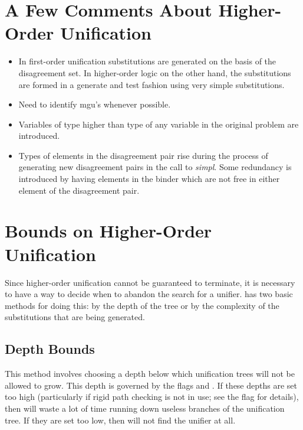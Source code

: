 \section{A Few Comments About Higher-Order Unification}
\begin{itemize}
\item In first-order unification substitutions are generated on the basis of the
disagreement set. In higher-order logic on the other hand,
the substitutions are formed in a generate and test fashion using very simple
substitutions.

\item Need to identify mgu's whenever possible.

\item Variables of type higher than type of any variable in the original problem are
introduced.

\item Types of elements in the disagreement pair rise during the process of
generating new disagreement pairs in the call to {\it simpl}. Some redundancy
is introduced by having elements in the binder which are not free in either
element of the disagreement pair.
\end{itemize}

\section{Bounds on Higher-Order Unification}
Since higher-order unification cannot be guaranteed to terminate, it is necessary
to have a way to decide when to abandon the search for a unifier. {\TPS} has two
basic methods for doing this: by the depth of the tree or by the complexity of
the substitutions that are being generated.

\subsection{Depth Bounds}
This method involves choosing a depth below which unification trees will not be
allowed to grow. This depth is governed by the flags  and
. If these depths are set too high (particularly if rigid path
checking is not in use; see the flag  for details), then {\TPS} will
waste a lot of time running down useless branches of the unification tree. If they are set too low,
then {\TPS} will not find the unifier at all.

